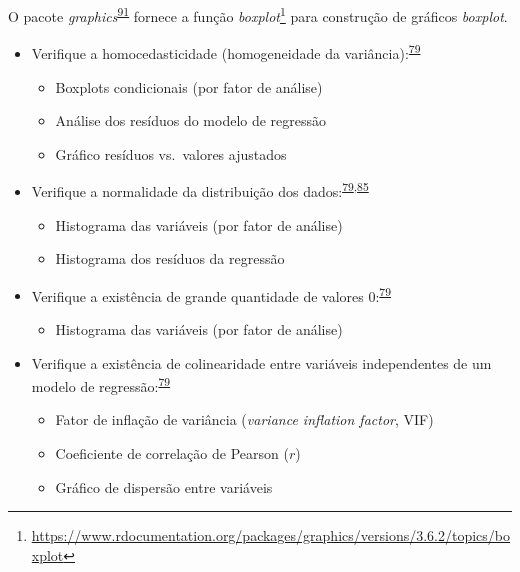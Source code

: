 \documentclass[
  a4paper,
]{book}
\providecommand{\tightlist}{%
  \setlength{\itemsep}{0pt}\setlength{\parskip}{0pt}}
\renewcommand{\href}[2]{#2\footnote{\url{#1}}}
\newenvironment{infobox}[1]
  {
  \begin{itemize}
  \renewcommand{\labelitemi}{
    \raisebox{-.7\height}[0pt][0pt]{
      {\setkeys{Gin}{width=3em,keepaspectratio}
        \texttt{[image: \#1]}}
    }
  }
  \setlength{\fboxsep}{1em}
  \begin{blackbox}
  \item
  }
  {
  \end{blackbox}
  \end{itemize}
  }
\begin{document}
\begin{infobox}{images/Rlogo}
O pacote \emph{graphics}\textsuperscript{\protect\hyperlink{ref-graphics}{91}} fornece a função \href{https://www.rdocumentation.org/packages/graphics/versions/3.6.2/topics/boxplot}{\emph{boxplot}} para construção de gráficos \emph{boxplot}.

\end{infobox}

\begin{itemize}
\item
  Verifique a homocedasticidade (homogeneidade da variância):\textsuperscript{\protect\hyperlink{ref-zuur2009}{79}}

  \begin{itemize}
  \item
    Boxplots condicionais (por fator de análise)
  \item
    Análise dos resíduos do modelo de regressão
  \item
    Gráfico resíduos vs.~valores ajustados
  \end{itemize}
\end{itemize}

\begin{itemize}
\item
  Verifique a normalidade da distribuição dos dados:\textsuperscript{\protect\hyperlink{ref-zuur2009}{79},\protect\hyperlink{ref-chatfield1986}{85}}

  \begin{itemize}
  \item
    Histograma das variáveis (por fator de análise)
  \item
    Histograma dos resíduos da regressão
  \end{itemize}
\end{itemize}

\begin{itemize}
\item
  Verifique a existência de grande quantidade de valores 0:\textsuperscript{\protect\hyperlink{ref-zuur2009}{79}}

  \begin{itemize}
  \tightlist
  \item
    Histograma das variáveis (por fator de análise)
  \end{itemize}
\end{itemize}

\begin{itemize}
\item
  Verifique a existência de colinearidade entre variáveis independentes de um modelo de regressão:\textsuperscript{\protect\hyperlink{ref-zuur2009}{79}}

  \begin{itemize}
  \item
    Fator de inflação de variância (\emph{variance inflation factor}, VIF)
  \item
    Coeficiente de correlação de Pearson (\(r\))
  \item
    Gráfico de dispersão entre variáveis
  \end{itemize}
\end{itemize}
\end{document}
